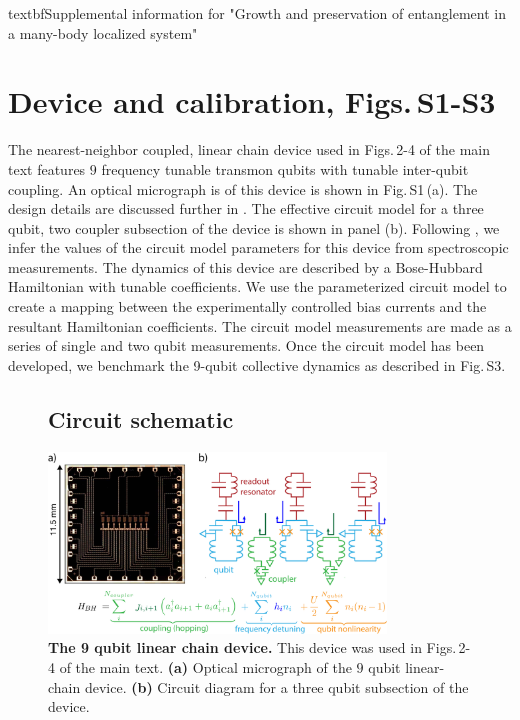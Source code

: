 textbf{\large Supplemental information for "Growth and preservation of entanglement in a many-body localized system"}

\section{Device and calibration, Figs.\,S1-S3}
The nearest-neighbor coupled, linear chain device used in Figs.\,2-4 of the main text features $9$ frequency tunable transmon qubits with tunable inter-qubit coupling.
An optical micrograph is of this device is shown in Fig.\,S1\,(a).
The design details are discussed further in \cite{Neill2018}.
The effective circuit model for a three qubit, two coupler subsection of the device is shown in panel (b).
Following \cite{Neill2018}, we infer the values of the circuit model parameters for this device from spectroscopic measurements.
The dynamics of this device are described by a Bose-Hubbard Hamiltonian with tunable coefficients.
We use the parameterized circuit model to create a mapping between the experimentally controlled bias currents and the resultant Hamiltonian coefficients.
The circuit model measurements are made as a series of single and two qubit measurements.
Once the circuit model has been developed, we benchmark the 9-qubit collective dynamics as described in Fig.\,S3.
\begin{figure}[h]
\subsection{Circuit schematic}
    \centering
    \includegraphics[width=0.80\textwidth, keepaspectratio]{./PDF/fs1_190916_1029a.pdf}
    \caption{\textbf{The 9 qubit linear chain device.} This device was used in Figs.\,2-4 of the main text.
    \textbf{(a)} Optical micrograph of the $9$ qubit linear-chain device.
    \textbf{(b)} Circuit diagram for a three qubit subsection of the device.}
\end{figure}

